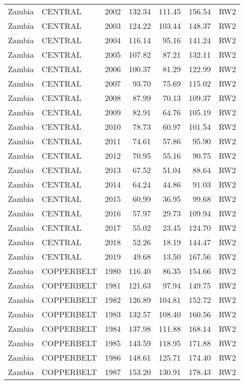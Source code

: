 \begin{longtable}{lllrrrl}
  Zambia & CENTRAL & 2002 & 132.34 & 111.45 & 156.54 & RW2 \\ 
  Zambia & CENTRAL & 2003 & 124.22 & 103.44 & 148.37 & RW2 \\ 
  Zambia & CENTRAL & 2004 & 116.14 & 95.16 & 141.24 & RW2 \\ 
  Zambia & CENTRAL & 2005 & 107.82 & 87.21 & 132.11 & RW2 \\ 
  Zambia & CENTRAL & 2006 & 100.37 & 81.29 & 122.99 & RW2 \\ 
  Zambia & CENTRAL & 2007 & 93.70 & 75.69 & 115.02 & RW2 \\ 
  Zambia & CENTRAL & 2008 & 87.99 & 70.13 & 109.37 & RW2 \\ 
  Zambia & CENTRAL & 2009 & 82.91 & 64.76 & 105.19 & RW2 \\ 
  Zambia & CENTRAL & 2010 & 78.73 & 60.97 & 101.54 & RW2 \\ 
  Zambia & CENTRAL & 2011 & 74.61 & 57.86 & 95.90 & RW2 \\ 
  Zambia & CENTRAL & 2012 & 70.95 & 55.16 & 90.75 & RW2 \\ 
  Zambia & CENTRAL & 2013 & 67.52 & 51.04 & 88.64 & RW2 \\ 
  Zambia & CENTRAL & 2014 & 64.24 & 44.86 & 91.03 & RW2 \\ 
  Zambia & CENTRAL & 2015 & 60.99 & 36.95 & 99.68 & RW2 \\ 
  Zambia & CENTRAL & 2016 & 57.97 & 29.73 & 109.94 & RW2 \\ 
  Zambia & CENTRAL & 2017 & 55.02 & 23.45 & 124.70 & RW2 \\ 
  Zambia & CENTRAL & 2018 & 52.26 & 18.19 & 144.47 & RW2 \\ 
  Zambia & CENTRAL & 2019 & 49.68 & 13.50 & 167.56 & RW2 \\ 
  Zambia & COPPERBELT & 1980 & 116.40 & 86.35 & 154.66 & RW2 \\ 
  Zambia & COPPERBELT & 1981 & 121.63 & 97.94 & 149.75 & RW2 \\ 
  Zambia & COPPERBELT & 1982 & 126.89 & 104.81 & 152.72 & RW2 \\ 
  Zambia & COPPERBELT & 1983 & 132.57 & 108.40 & 160.56 & RW2 \\ 
  Zambia & COPPERBELT & 1984 & 137.98 & 111.88 & 168.14 & RW2 \\ 
  Zambia & COPPERBELT & 1985 & 143.59 & 118.95 & 171.88 & RW2 \\ 
  Zambia & COPPERBELT & 1986 & 148.61 & 125.71 & 174.40 & RW2 \\ 
  Zambia & COPPERBELT & 1987 & 153.20 & 130.91 & 178.43 & RW2 \\ 

\end{longtable}
